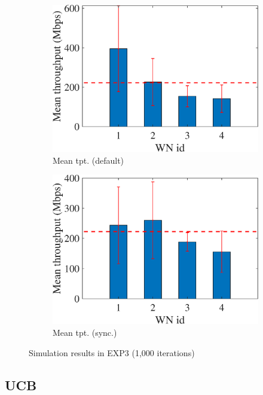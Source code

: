 \documentclass[preprint,12pt]{article}
\begin{document}
\begin{figure}[h!]
	\begin{subfigure}[b]{.33\textwidth}
		\includegraphics[width=\textwidth]{images/mean_tpt_EXP3}
		\caption{Mean tpt. (default)}\label{fig:mean_tpt_EXP3}
	\end{subfigure}
	\begin{subfigure}[b]{.33\textwidth}
		\includegraphics[width=\textwidth]{images/mean_tpt_OEXP3}
		\caption{Mean tpt. (sync.)}\label{fig:mean_tpt_OEXP3}
	\end{subfigure}
	\caption{Simulation results in EXP3 (1,000 iterations)}
	\label{fig:exp3}
\end{figure}

\subsection{UCB}
\label{section:ucb}
\end{document}
